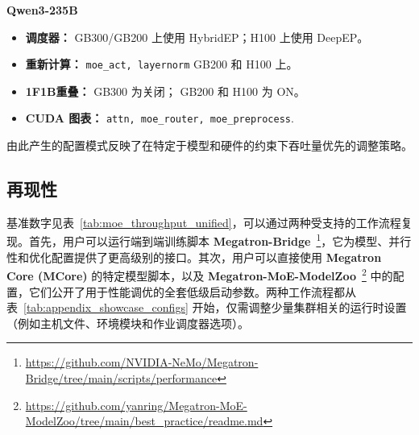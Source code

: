 \documentclass[10pt,logo,copyright]{nvidiatechreport_zh}
\begin{document}
\textbf{Qwen3-235B}
\begin{itemize}[noitemsep,topsep=0pt]
    \item \textbf{调度器：} GB300/GB200 上使用 HybridEP；H100 上使用 DeepEP。
    \item \textbf{重新计算：} \texttt{moe\_act, layernorm} GB200 和 H100 上。
    \item \textbf{1F1B重叠：} GB300 为关闭； GB200 和 H100 为 ON。
    \item \textbf{CUDA 图表：} \texttt{attn, moe\_router, moe\_preprocess}.
\end{itemize}
由此产生的配置模式反映了在特定于模型和硬件的约束下吞吐量优先的调整策略。

\subsection{再现性} 
基准数字见表~\ref{tab:moe_throughput_unified}，可以通过两种受支持的工作流程复现。首先，用户可以运行端到端训练脚本 \textbf{Megatron-Bridge}~\footnote{\url{https://github.com/NVIDIA-NeMo/Megatron-Bridge/tree/main/scripts/performance}}，它为模型、并行性和优化配置提供了更高级别的接口。其次，用户可以直接使用 \textbf{Megatron Core (MCore)} 的特定模型脚本，以及 \textbf{Megatron-MoE-ModelZoo}~\footnote{\url{https://github.com/yanring/Megatron-MoE-ModelZoo/tree/main/best_practice/readme.md}} 中的配置，它们公开了用于性能调优的全套低级启动参数。两种工作流程都从表~\ref{tab:appendix_showcase_configs} 开始，仅需调整少量集群相关的运行时设置（例如主机文件、环境模块和作业调度器选项）。
\end{document}
